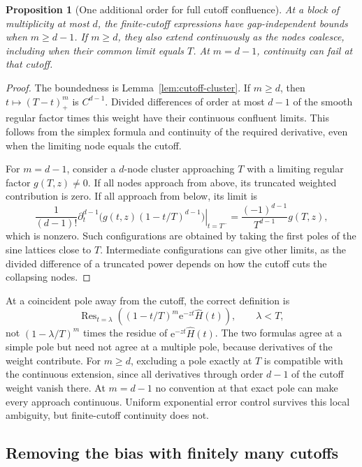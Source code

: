 \documentclass[11pt,a4paper]{article}
\numberwithin{equation}{section}
\newtheorem{proposition}[theorem]{Proposition}
\theoremstyle{definition}
\theoremstyle{remark}
\newcommand{\e}{\mathrm e}
\newcommand{\Res}{\operatorname{Res}}
\begin{document}
\begin{proposition}[One additional order for full cutoff confluence]
\label{prop:confluence}
At a block of multiplicity at most $d$, the finite-cutoff expressions
have gap-independent bounds when $m\ge d-1$. If $m\ge d$, they also
extend continuously as the nodes coalesce, including when their common
limit equals $T$. At $m=d-1$, continuity can fail at that cutoff.
\end{proposition}
\begin{proof}
The boundedness is Lemma~\ref{lem:cutoff-cluster}. If $m\ge d$, then
$t\mapsto(T-t)_+^m$ is $C^{d-1}$. Divided differences of order at most
$d-1$ of the smooth regular factor times this weight have their
continuous confluent limits. This follows from the simplex formula
and continuity of the required derivative, even when the limiting
node equals the cutoff.

For $m=d-1$, consider a $d$-node cluster approaching $T$ with a limiting
regular factor $g(T,z)\ne0$. If all nodes approach from above, its
truncated weighted contribution is zero. If all approach from below,
its limit is
\[
 \frac{1}{(d-1)!}\left.
    \partial_t^{d-1}\bigl(g(t,z)(1-t/T)^{d-1}\bigr)
       \right|_{t=T^-}
   =\frac{(-1)^{d-1}}{T^{d-1}}g(T,z),
\]
which is nonzero. Such configurations are obtained by taking the first
poles of the sine lattices close to $T$. Intermediate configurations
can give other limits, as the divided difference of a truncated power
depends on how the cutoff cuts the collapsing nodes.
\end{proof}

At a coincident pole away from the cutoff, the correct definition is
\begin{equation}
 \Res_{t=\lambda}\left((1-t/T)^m\e^{-zt}\widehat H(t)\right),
 \qquad \lambda<T,
 \label{eq:multiple-weight}
\end{equation}
not $(1-\lambda/T)^m$ times the residue of
$\e^{-zt}\widehat H(t)$. The two formulas agree at a simple pole but
need not agree at a multiple pole, because derivatives of the weight
contribute. For $m\ge d$, excluding a pole exactly at $T$ is compatible
with the continuous extension, since all derivatives through order
$d-1$ of the cutoff weight vanish there. At $m=d-1$ no convention at
that exact pole can make every approach continuous. Uniform exponential
error control survives this local ambiguity, but finite-cutoff
continuity does not.

\subsection{Removing the bias with finitely many cutoffs}
\end{document}
